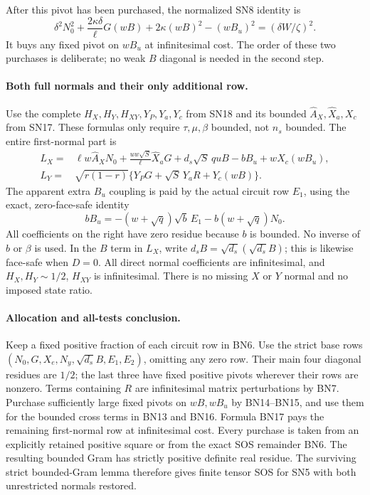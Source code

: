 After this pivot has been purchased, the normalized SN8 identity is
\[
 \delta^2N_0^2+\frac{2\kappa\delta}{\ell}G(wB)
          +2\kappa(wB)^2-(wB_u)^2
                         =(\delta W/\zeta)^2.
 \tag{BN15}
\]
It buys any fixed pivot on $wB_u$ at infinitesimal cost. The order of
these two purchases is deliberate; no weak $B$ diagonal is needed
in the second step.

\paragraph{Both full normals and their only additional row.}
Use the complete $H_X,H_Y,H_{XY},Y_P,Y_a,Y_c$ from SN18 and its
bounded $\widehat A_X,\widehat X_a,X_c$ from SN17. These formulas
only require $\tau,\mu,\beta$ bounded, not $n_s$ bounded.
The entire first-normal part is
\[
\begin{split}
 L_X={}&\ell w\widehat A_XN_0
       +\frac{uw\sqrt S}{\ell}\widehat X_aG
       +d_s\sqrt S\,quB-bB_u+wX_c(wB_u),\\
 L_Y={}&\sqrt{r(1-r)}\{Y_PG+\sqrt S\,Y_aR+Y_c(wB)\}.
\end{split}\tag{BN16}
\]
The apparent extra $B_u$ coupling is paid by the actual circuit row
$E_1$, using the exact, zero-face-safe identity
\[
 bB_u=-(w+\sqrt q)\sqrt b\,E_1-b(w+\sqrt q)N_0.
 \tag{BN17}
\]
All coefficients on the right have zero residue because $b$ is
bounded. No inverse of $b$ or $\beta$ is used. In the $B$ term in
$L_X$, write $d_sB=\sqrt{d_s}(\sqrt{d_s}B)$; this is likewise
face-safe when $D=0$. All direct normal coefficients are
infinitesimal, and $H_X,H_Y\sim1/2$, $H_{XY}$ is infinitesimal.
There is no missing $X$ or $Y$ normal and no imposed state ratio.

\paragraph{Allocation and all-tests conclusion.}
Keep a fixed positive fraction of each circuit row in BN6.
Use the strict base rows $(N_0,G,X_e,N_y,\sqrt{d_s}B,E_1,E_2)$,
omitting any zero row. Their main four diagonal residues are $1/2$;
the last three have fixed positive pivots wherever their rows are
nonzero. Terms containing $R$ are infinitesimal matrix perturbations
by BN7. Purchase sufficiently large fixed pivots on $wB,wB_u$ by
BN14--BN15, and use them for the bounded cross terms in BN13 and
BN16. Formula BN17 pays the remaining first-normal row at
infinitesimal cost. Every purchase is taken from an explicitly
retained positive square or from the exact SOS remainder BN6.
The resulting bounded Gram has strictly positive definite real
residue. The surviving strict bounded-Gram lemma therefore gives
finite tensor SOS for SN5 with both unrestricted normals restored.

